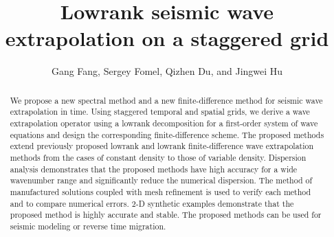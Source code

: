 
\title{Lowrank seismic wave extrapolation on a staggered grid}
\author{Gang Fang\footnotemark[1], Sergey Fomel\footnotemark[2], Qizhen Du\footnotemark[3], and Jingwei Hu\footnotemark[4]}

\address{
\footnotemark[1]School of Geosciences\\
China University of Petroleum (East China)\\
Qingdao, Shandong 266580, China \\ 
fangg.geo@gmail.com; gangfang@utexas.edu\\
\footnotemark[2]Bureau of Economic Geology, \\
John A. and Katherine G. Jackson School of Geosciences \\
The University of Texas at Austin \\
University Station, Box X \\
Austin, TX 78713-8972, USA \\
sergey.fomel@beg.utexas.edu \\
\footnotemark[3]School of Geosciences\\
China University of Petroleum (East China)\\
Qingdao, Shandong  266580, China \\ 
multicomponent@163.com; duqizhen@upc.edu.cn\\
\footnotemark[4]Institute for Computational Engineering and Sciences (ICES)\\
The University of Texas at Austin\\
201 East 24th St, Stop C0200, Austin, TX 78712, USA\\
hu@ices.utexas.edu\\
}



\maketitle

\begin{abstract}
We propose a new spectral method and a new finite-difference method for seismic wave extrapolation in time. Using staggered temporal and spatial grids, we derive a wave extrapolation operator using a lowrank decomposition for a first-order system of wave equations and design the corresponding finite-difference scheme. The proposed methods extend previously proposed lowrank and lowrank finite-difference wave extrapolation methods from the cases of constant density to those of variable density. Dispersion analysis demonstrates that the proposed methods have high accuracy for a wide wavenumber range and significantly reduce the numerical dispersion. The method of manufactured solutions coupled with mesh refinement is used to verify each method and to compare numerical errors. 2-D synthetic examples demonstrate that the proposed method is highly accurate and stable. The proposed methods can be used for seismic modeling or reverse time migration.
\end{abstract}


